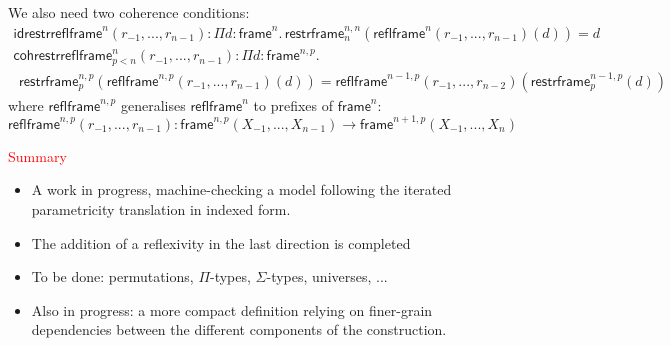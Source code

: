 \documentclass[12pt,landscape]{article}
\begin{document}
\begin{Large}
\begin{sf}
\bigskip

We also need two coherence conditions:
$$
\!\!\begin{array}{l}
\mathsf{idrestrreflframe}^n(r_{-1},...,r_{n-1}): \Pi d:\mathsf{frame}^n.\,\mathsf{restrframe}^{n,n}_n(\mathsf{reflframe}^n(r_{-1},...,r_{n-1})(d)) = d\\
\mathsf{cohrestrreflframe}^n_{p<n}(r_{-1},...,r_{n-1}): \Pi d:\mathsf{frame}^{n,p}.\,\\
~\,\mathsf{restrframe}^{n,p}_p(\mathsf{reflframe}^{n,p}(r_{-1},...,r_{n-1})(d)) =
\mathsf{reflframe}^{n-1,p}(r_{-1},...,r_{n-2})(\mathsf{restrframe}^{n-1,p}_p(d))
\end{array}
$$
where $\mathsf{reflframe}^{n,p}$ generalises $\mathsf{reflframe}^{n}$
to prefixes of $\mathsf{frame}^n$:
$$\mathsf{reflframe}^{n,p}(r_{-1},...,r_{n-1}):\mathsf{frame}^{n,p}(X_{-1},...,X_{n-1})
\rightarrow \mathsf{frame}^{n+1,p}(X_{-1},...,X_{n})$$

\newpage

\begin{center}
\textcolor{red}{\huge Summary}
\end{center}

\bigskip
\begin{itemize}
\item A work in progress, machine-checking a model following the iterated parametricity translation in indexed form.

\item The addition of a reflexivity in the last direction is completed

\item To be done: permutations, $\Pi$-types, $\Sigma$-types, universes, ...

\item Also in progress: a more compact definition relying on
  finer-grain dependencies between the different components of the
  construction.

\end{itemize}
\end{sf}
\end{Large}
\end{document}
